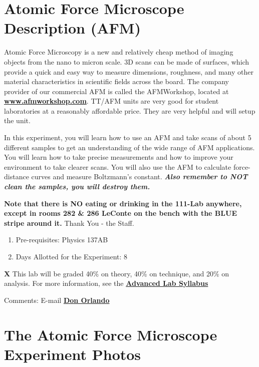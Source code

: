 \documentclass{../lab}
\begin{document}
\maketitle

\tableofcontents

\section{Atomic Force Microscope Description (AFM)}

Atomic Force Microscopy is a new and relatively cheap method of imaging objects from the nano to micron scale.  3D scans can be made of surfaces, which provide a quick and easy way to measure dimensions, roughness, and many other material characteristics in scientific fields across the board. The company provider of our commercial AFM is called the AFMWorkshop, located at \href{http://www.afmworkshop.com/}{\textbf{www.afmworkshop.com}}. TT/AFM units are very good for student laboratories at a reasonably affordable price. They are very helpful and will setup the unit.

In this experiment, you will learn how to use an AFM and take scans of about 5 different samples to get an understanding of the wide range of AFM applications. You will learn how to take precise measurements and how to improve your environment to take clearer scans. You will also use the AFM to calculate force-distance curves and measure Boltzmann's constant. \emph{\textbf{Also remember to NOT clean the samples, you will destroy them.}}

\textbf{Note that there is NO eating or drinking in the 111-Lab anywhere, except in rooms 282 \& 286 LeConte on the bench with the BLUE stripe around it.} Thank You - the Staff.

\begin{enumerate}
    \item Pre-requisites: Physics 137AB

    \item Days Allotted for the Experiment: 8
\end{enumerate}

\textbf{X} This lab will be graded 40\% on theory, 40\% on technique, and 20\% on analysis. For more information, see the \href{\AdvancedLabSyllabus}{\textbf{Advanced Lab Syllabus}}

Comments: E-mail \href{\MailDonOrlando}{\textbf{Don Orlando}}

\pagebreak

\section{The Atomic Force Microscope Experiment Photos}
\end{document}
